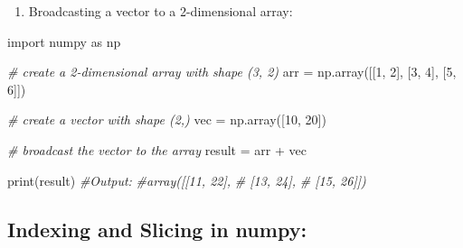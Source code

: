 \documentclass[11pt]{article}
\providecommand{\tightlist}{%
      \setlength{\itemsep}{0pt}\setlength{\parskip}{0pt}}
\newenvironment{Shaded}{}{}
\newcommand{\DecValTok}[1]{\textcolor[rgb]{0.25,0.63,0.44}{{#1}}}
\newcommand{\CommentTok}[1]{\textcolor[rgb]{0.38,0.63,0.69}{\textit{{#1}}}}
\newcommand{\NormalTok}[1]{{#1}}
\newcommand{\ImportTok}[1]{{#1}}
\newcommand{\OperatorTok}[1]{\textcolor[rgb]{0.40,0.40,0.40}{{#1}}}
\newcommand{\BuiltInTok}[1]{{#1}}
\begin{document}
\begin{enumerate}
\def\labelenumi{\arabic{enumi}.}
\setcounter{enumi}{2}
\tightlist
\item
  Broadcasting a vector to a 2-dimensional array:
\end{enumerate}

\begin{Shaded}
\begin{Highlighting}[]
\ImportTok{import}\NormalTok{ numpy }\ImportTok{as}\NormalTok{ np}

\CommentTok{\# create a 2{-}dimensional array with shape (3, 2)}
\NormalTok{arr }\OperatorTok{=}\NormalTok{ np.array([[}\DecValTok{1}\NormalTok{, }\DecValTok{2}\NormalTok{], [}\DecValTok{3}\NormalTok{, }\DecValTok{4}\NormalTok{], [}\DecValTok{5}\NormalTok{, }\DecValTok{6}\NormalTok{]])}

\CommentTok{\# create a vector with shape (2,)}
\NormalTok{vec }\OperatorTok{=}\NormalTok{ np.array([}\DecValTok{10}\NormalTok{, }\DecValTok{20}\NormalTok{])}

\CommentTok{\# broadcast the vector to the array}
\NormalTok{result }\OperatorTok{=}\NormalTok{ arr }\OperatorTok{+}\NormalTok{ vec}

\BuiltInTok{print}\NormalTok{(result)}
\CommentTok{\#Output:}
\CommentTok{\#array([[11, 22],}
\CommentTok{\#       [13, 24],}
\CommentTok{\#       [15, 26]])}
\end{Highlighting}
\end{Shaded}

\hypertarget{indexing-and-slicing-in-numpy}{%
\subsection{Indexing and Slicing in
numpy:}\label{indexing-and-slicing-in-numpy}}
\end{document}
